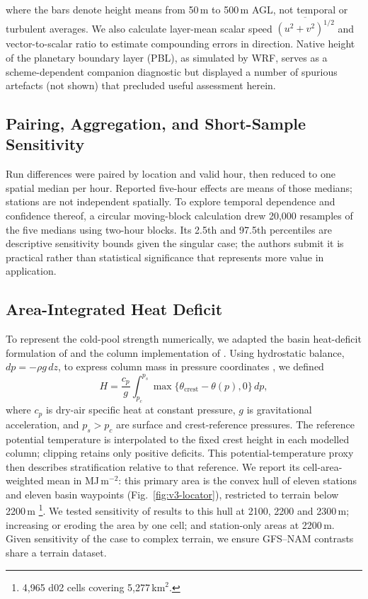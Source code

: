 \documentclass[air,article,submit,moreauthors]{Definitions/mdpi}
\begin{document}
where the bars denote height means from 50\,m to 500\,m AGL, not temporal or turbulent averages.
We also calculate layer-mean scalar speed $\overline{(u^{2}+v^{2})^{1/2}}$ and vector-to-scalar ratio to estimate compounding errors in direction.
Native height of the planetary boundary layer (PBL), as simulated by WRF, serves as a scheme-dependent companion diagnostic \citep{Tran2018FDDA} but displayed a number of spurious artefacts (not shown) that precluded useful assessment herein.

\subsection{Pairing, Aggregation, and Short-Sample Sensitivity}
\label{sec:v3-aggregation}

Run differences were paired by location and valid hour, then reduced to one spatial median per hour.
Reported five-hour effects are means of those medians; stations are not independent spatially.
To explore temporal dependence \citep{Wilks2019} and confidence thereof, a circular moving-block calculation drew 20,000 resamples of the five medians using two-hour blocks.
Its 2.5th and 97.5th percentiles are descriptive sensitivity bounds given the singular case; the authors submit it is practical rather than statistical significance that  represents more value in application.

\subsection{Area-Integrated Heat Deficit}
\label{sec:v3-heatdeficit-methods}

To represent the cold-pool strength numerically, we adapted the basin heat-deficit formulation of \citet{Whiteman1999} and the column implementation of \citet{Adler2023}.
Using hydrostatic balance, $dp=-\rho g\,dz$, to express column mass in pressure coordinates \citep{WallaceHobbs2006}, we defined
\begin{equation}
H=\frac{c_{p}}{g}\int_{p_{c}}^{p_{s}}\max\{\theta_{\mathrm{crest}}-\theta(p),0\}\,dp,
\end{equation}
where $c_{p}$ is dry-air specific heat at constant pressure, $g$ is gravitational acceleration, and $p_s>p_c$ are surface and crest-reference pressures.
The reference potential temperature is interpolated to the fixed crest height in each modelled column; clipping retains only positive deficits.
This potential-temperature proxy then describes stratification relative to that reference.
We report its cell-area-weighted mean in MJ\,m$^{-2}$: this primary area is the convex hull of eleven stations and eleven basin waypoints (Fig.~\ref{fig:v3-locator}), restricted to terrain below 2200\,m \footnote{4,965 d02 cells covering 5,277\,km$^{2}$.}.
We tested sensitivity of results to this hull at 2100, 2200 and 2300\,m; increasing or eroding the area by one cell; and station-only areas at 2200\,m.
Given sensitivity of the case to complex terrain, we ensure GFS--NAM contrasts share a terrain dataset.
\end{document}
